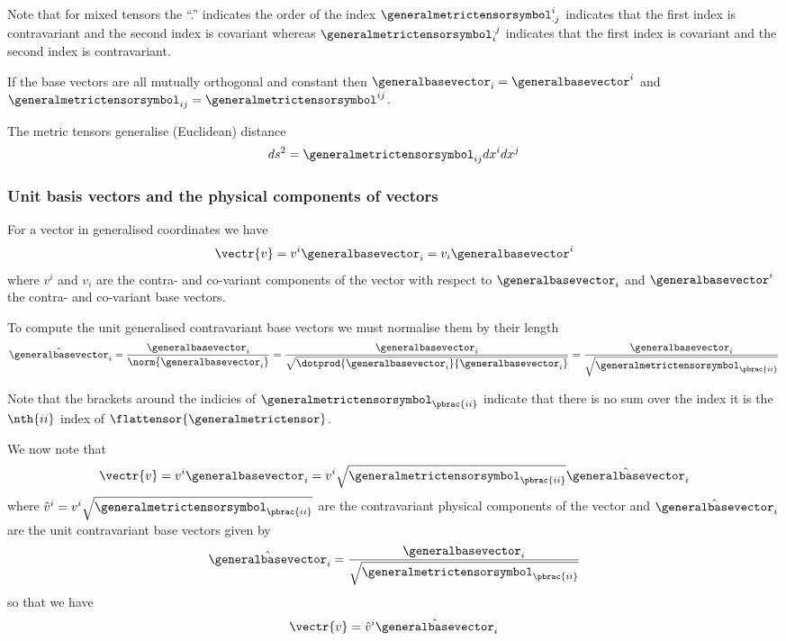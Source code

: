 Note that for mixed tensors the ``.'' indicates the order of the index \ie
$\generalmetrictensorsymbol^{i}_{.j}$ indicates that the first index is contravariant and the second
index is covariant whereas $\generalmetrictensorsymbol_{i}^{.j}$ indicates that the first index is
covariant and the second index is contravariant.

If the base vectors are all mutually orthogonal and constant then
$\generalbasevector_{i}=\generalbasevector^{i}$ and $\generalmetrictensorsymbol_{ij}=\generalmetrictensorsymbol^{ij}$.

The metric tensors generalise (Euclidean) distance \ie
\begin{equation}
  ds^{2}=\generalmetrictensorsymbol_{ij}dx^{i}dx^{j}
\end{equation}

\subsubsection{Unit basis vectors and the physical components of vectors}

For a vector in generalised coordinates we have
\begin{equation}
  \vectr{v}=v^{i}\generalbasevector_{i}=v_{i}\generalbasevector^{i}
\end{equation}
where $v^{i}$ and $v_{i}$ are the contra- and co-variant components of the vector with respect to $\generalbasevector_{i}$ and $\generalbasevector^{i}$ the contra- and co-variant base vectors.

To compute the unit generalised contravariant base vectors we must normalise them by their length \ie
\begin{equation}
  \hat{\generalbasevector}_{i}=\dfrac{\generalbasevector_{i}}{\norm{\generalbasevector_{i}}}=\dfrac{\generalbasevector_{i}}{\sqrt{\dotprod{\generalbasevector_{i}}{\generalbasevector_{i}}}}=\dfrac{\generalbasevector_{i}}{\sqrt{\generalmetrictensorsymbol_{\pbrac{ii}}}}
\end{equation}

Note that the brackets around the indicies of $\generalmetrictensorsymbol_{\pbrac{ii}}$ indicate that there is no sum over the index \ie it is the $\nth{ii}$ index of $\flattensor{\generalmetrictensor}$.

We now note that
\begin{equation}
  \vectr{v}=v^{i}\generalbasevector_{i}=v^{i}\sqrt{\generalmetrictensorsymbol_{\pbrac{ii}}}\hat{\generalbasevector}_{i}
\end{equation}
where
$\hat{v}^{i}=v^{i}\sqrt{\generalmetrictensorsymbol_{\pbrac{ii}}}$ are
the contravariant physical components of the vector and
$\hat{\generalbasevector}_{i}$ are the unit contravariant base vectors
given by
\begin{equation}
  \hat{\generalbasevector}_{i}=\dfrac{\generalbasevector_{i}}{\sqrt{\generalmetrictensorsymbol_{\pbrac{ii}}}}
\end{equation}
so that we have
\begin{equation}
  \vectr{v}=\hat{v}^{i}\hat{\generalbasevector}_{i}
\end{equation}

